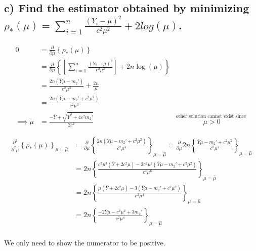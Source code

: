 \documentclass[
  letterpaper,
  DIV=11,
  numbers=noendperiod]{scrreprt}
\begin{document}
\newpage

\hypertarget{c-find-the-estimator-obtained-by-minimizing-rho_mu-sum_i1n-fracy_i--mu2c2mu2-2logmu.}{%
\subsection{\texorpdfstring{c) Find the estimator obtained by minimizing
\(\rho_*(\mu) = \sum_{i=1}^n \frac{(Y_i- \mu)^2}{c^2\mu^2} + 2log(\mu)\).}{c) Find the estimator obtained by minimizing \textbackslash rho\_*(\textbackslash mu) = \textbackslash sum\_\{i=1\}\^{}n \textbackslash frac\{(Y\_i- \textbackslash mu)\^{}2\}\{c\^{}2\textbackslash mu\^{}2\} + 2log(\textbackslash mu).}}\label{c-find-the-estimator-obtained-by-minimizing-rho_mu-sum_i1n-fracy_i--mu2c2mu2-2logmu.}}

\[\begin{aligned}
0 &= \frac{\partial}{\partial \mu} \left\{\rho_*(\mu)\right\} \\
&= \frac{\partial}{\partial \mu} \left\{\left[ \sum_{i=1}^n \frac{(Y_i- \mu)^2}{c^2\mu^2} \right] + 2n\log(\mu)\right\}\\
&= \frac{2n(\bar{Y}\mu -m_2')}{c^2\mu^3} +\frac{2n}{\mu} \\
&= \frac{2n(\bar{Y}\mu -m_2'+c^2\mu^2)}{c^2\mu^3}\\
\implies \mu &= \frac{-\bar{Y} + \sqrt{\bar{Y}^2+4c^2m_2'}}{2c^2} & \overset {\text{other solution cannot exist since }}{\mu > 0}
\end{aligned}
\]

\[
\begin{aligned}
\frac{\partial^2}{\partial^2 \mu} \left\{\rho_*(\mu)\right\}_{\mu = \hat{\mu}}
&=\frac{\partial}{\partial \mu} \left\{ \frac{2n(\bar{Y}\mu -m_2'+c^2\mu^2)}{c^2\mu^3} \right\}_{\mu = \hat{\mu}}
=\frac{\partial}{\partial \mu} 2n\left\{ \frac{\bar{Y}\mu -m_2'+c^2\mu^2}{c^2\mu^3} \right\}_{\mu = \hat{\mu}} \\
&=2n\left\{\frac{c^2\mu^3(\bar{Y}+2c^2\mu)-3c^2\mu^2(\bar{Y}\mu -m_2'+c^2\mu^2)}{c^4\mu^6} \right\}_{\mu = \hat{\mu}} \\
&=2n\left\{\frac{\mu(\bar{Y}+2c^2\mu)-3(\bar{Y}\mu -m_2'+c^2\mu^2)}{c^2\mu^4} \right\}_{\mu = \hat{\mu}} \\
&=2n\left\{\frac{-2\bar{Y}\mu - c^2\mu^2+3m_2'}{c^2\mu^4} \right\}_{\mu = \hat{\mu}} \\
\end{aligned}
\]

We only need to show the numerator to be positive.
\end{document}
